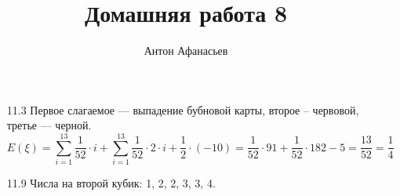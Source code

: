 \documentclass[10pt]{article}
\begin{document}
\title{Домашняя работа 8}
\author{Антон Афанасьев}
\maketitle

\begin{enumerate}
\item[11.3] Первое слагаемое --- выпадение бубновой карты, второе -- червовой, третье --- черной.
$$E(\xi) = \sum_{i=1}^{13} \frac{1}{52} \cdot i + \sum_{i=1}^{13} \frac{1}{52} \cdot 2\cdot i + \frac{1}{2} \cdot (-10) = \frac{1}{52} \cdot 91 + \frac{1}{52} \cdot 182 - 5 = \frac{13}{52} = \frac{1}{4}$$

\item[11.9] Числа на второй кубик: 1, 2, 2, 3, 3, 4.

\end{enumerate}
\end{document}

